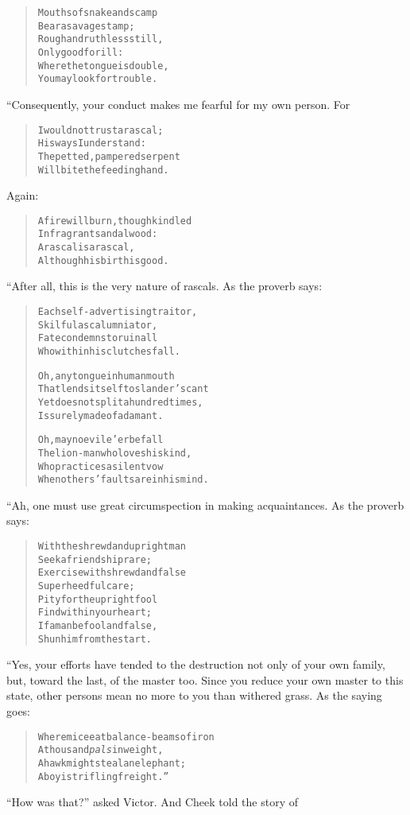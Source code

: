 \documentclass[article, twoside, 14pt]{memoir}
\renewenvironment{verbatim}{%
\begin{quote}%
\vskip -10pt%
\begin{alltt}\normalfont\large}{\end{alltt}%
\end{quote}%
\vskip -10pt
} %
\begin{document}
\begin{verbatim}
Mouths of snake and scamp
Bear a savage stamp;
Rough and ruthless still,
Only good for ill:
Where the tongue is double,
You may look for trouble.
\end{verbatim}
“Consequently, your conduct makes me fearful for my own person.
For

\begin{verbatim}
I would not trust a rascal;
    His ways I understand:
The petted, pampered serpent
    Will bite the feeding hand.
\end{verbatim}
Again:

\begin{verbatim}
A fire will burn, though kindled
    In fragrant sandalwood:
A rascal is a rascal,
    Although his birth is good.
\end{verbatim}
“After all, this is the very nature of rascals. As the proverb
says:

\begin{verbatim}
Each self-advertising traitor,
Skilful as calumniator,
Fate condemns to ruin all
Who within his clutches fall.

Oh, any tongue in human mouth
    That lends itself to slander's cant
Yet does not split a hundred times,
    Is surely made of adamant.

Oh, may no evil e'er befall
    The lion-man who loves his kind,
Who practices a silent vow
    When others' faults are in his mind.
\end{verbatim}
“Ah, one must use great circumspection in making acquaintances. As
the proverb says:

\begin{verbatim}
With the shrewd and upright man
    Seek a friendship rare;
Exercise with shrewd and false
    Superheedful care;
Pity for the upright fool
    Find within your heart;
If a man be fool and false,
    Shun him from the start.
\end{verbatim}
“Yes, your efforts have tended to the destruction not only of your
own family, but, toward the last, of the master too. Since you
reduce your own master to this state, other persons mean no more to
you than withered grass. As the saying goes:

\begin{verbatim}
Where mice eat balance-beams of iron
    A thousand \emph{pals} in weight,
A hawk might steal an elephant;
    A boy is trifling freight.”
\end{verbatim}
``How was that?'' asked Victor. And Cheek told the story of
\end{document}
